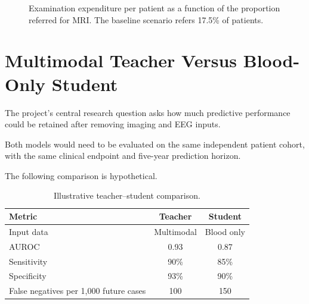 \documentclass[11pt,a4paper]{article}
\begin{document}
\begin{figure}[H]
\centering
{}

\caption{
Examination expenditure per patient as a function
of the proportion referred for MRI.
The baseline scenario refers 17.5\% of patients.
}
\end{figure}

\section{Multimodal Teacher Versus Blood-Only Student}

The project's central research question asks
how much predictive performance could be retained
after removing imaging and EEG inputs.

Both models would need to be evaluated on
the same independent patient cohort,
with the same clinical endpoint and
five-year prediction horizon.

The following comparison is hypothetical.

\begin{table}[H]
\centering
\caption{Illustrative teacher--student comparison.}
\begin{tabularx}{\linewidth}{@{}Xcc@{}}
\toprule
\textbf{Metric} &
\textbf{Teacher} &
\textbf{Student} \\
\midrule
Input data & Multimodal & Blood only \\
AUROC & 0.93 & 0.87 \\
Sensitivity & 90\% & 85\% \\
Specificity & 93\% & 90\% \\
False negatives per 1,000 future cases
& 100 & 150 \\
\bottomrule
\end{tabularx}
\end{table}
\end{document}
